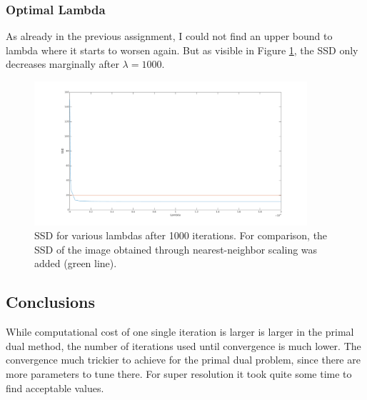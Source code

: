 \documentclass{paper}
\begin{document}
\subsubsection*{Optimal Lambda}
As already in the previous assignment, I could not find an upper bound to lambda where it starts to worsen again. But as visible in Figure \ref{fig:lambda_vs_ssd}, the SSD only decreases marginally after $\lambda=1000$.

\begin{figure}[ht!]%
\centering
\includegraphics[width=0.9\textwidth]{lambda_vs_ssd.png}
\caption{SSD for various lambdas after 1000 iterations. For comparison, the
SSD of the image obtained through nearest-neighbor scaling was added (green line).}
\label{fig:lambda_vs_ssd}
\end{figure}

\subsection*{Conclusions}
While computational cost of one single iteration is larger is larger 
in the primal dual method, the number of iterations used until convergence 
is much lower. The convergence much trickier to achieve for the primal dual problem,
since there are more parameters to tune there. For super resolution it took 
quite some time to find acceptable values.
\end{document}
